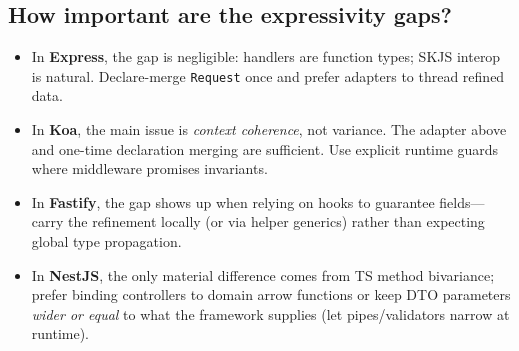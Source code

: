\documentclass[11pt]{article}
\begin{document}
\subsection{How important are the expressivity gaps?}
\begin{itemize}[leftmargin=*]
  \item In \textbf{Express}, the gap is negligible: handlers are function types; SKJS interop is natural. Declare-merge \texttt{Request} once and prefer adapters to thread refined data.
  \item In \textbf{Koa}, the main issue is \emph{context coherence}, not variance. The adapter above and one-time declaration merging are sufficient. Use explicit runtime guards where middleware promises invariants.
  \item In \textbf{Fastify}, the gap shows up when relying on hooks to guarantee fields---carry the refinement locally (or via helper generics) rather than expecting global type propagation.
  \item In \textbf{NestJS}, the only material difference comes from TS method bivariance; prefer binding controllers to domain arrow functions or keep DTO parameters \emph{wider or equal} to what the framework supplies (let pipes/validators narrow at runtime).
\end{itemize}
\end{document}
